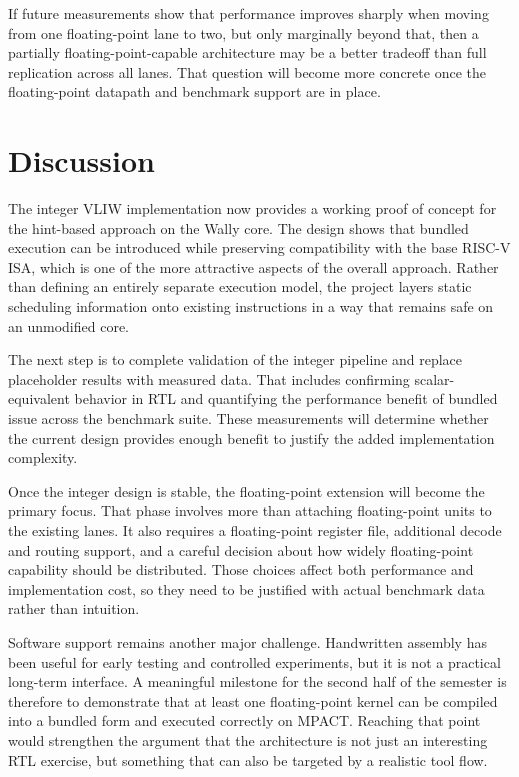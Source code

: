 \documentclass[conference,a4paper]{IEEEtran}
\begin{document}
If future measurements show that performance improves sharply when moving from one floating-point lane to two, but only marginally beyond that, then a partially floating-point-capable architecture may be a better tradeoff than full replication across all lanes. That question will become more concrete once the floating-point datapath and benchmark support are in place.

\section{Discussion}

The integer VLIW implementation now provides a working proof of concept for the hint-based approach on the Wally core. The design shows that bundled execution can be introduced while preserving compatibility with the base RISC-V ISA, which is one of the more attractive aspects of the overall approach. Rather than defining an entirely separate execution model, the project layers static scheduling information onto existing instructions in a way that remains safe on an unmodified core.

The next step is to complete validation of the integer pipeline and replace placeholder results with measured data. That includes confirming scalar-equivalent behavior in RTL and quantifying the performance benefit of bundled issue across the benchmark suite. These measurements will determine whether the current design provides enough benefit to justify the added implementation complexity.

Once the integer design is stable, the floating-point extension will become the primary focus. That phase involves more than attaching floating-point units to the existing lanes. It also requires a floating-point register file, additional decode and routing support, and a careful decision about how widely floating-point capability should be distributed. Those choices affect both performance and implementation cost, so they need to be justified with actual benchmark data rather than intuition.

Software support remains another major challenge. Handwritten assembly has been useful for early testing and controlled experiments, but it is not a practical long-term interface. A meaningful milestone for the second half of the semester is therefore to demonstrate that at least one floating-point kernel can be compiled into a bundled form and executed correctly on MPACT. Reaching that point would strengthen the argument that the architecture is not just an interesting RTL exercise, but something that can also be targeted by a realistic tool flow.
\end{document}
